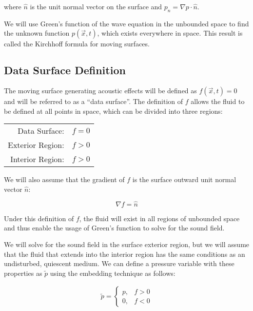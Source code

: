\documentclass[]{aiaa-tc}%
\begin{document}
\noindent where $\hat{n}$ is the unit normal vector on the surface and $p_n = \nabla p \cdot \hat{n}$.

We will use Green’s function of the wave equation in the unbounded space to find the unknown function $p(\vec{x},t)$, which exists everywhere in space. This result is called the Kirchhoff formula for moving surfaces.


\subsection{Data Surface Definition}

The moving surface generating acoustic effects will be defined as $f(\vec{x},t) = 0$ and will be referred to as a ``data surface''.  The definition of $f$ allows the fluid to be defined at all points in space, which can be divided into three regions:

\begin{center}
\begin{tabular}{| r  l |}
  \hline
  Data Surface:    & $f=0$ \\
  Exterior Region: & $f>0$ \\
  Interior Region: & $f>0$ \\
  \hline
\end{tabular}
\end{center}

\noindent We will also assume that the gradient of $f$ is the surface outward unit normal vector $\hat{n}$:

\begin{equation} \label{Gradfnormal}
\nabla f = \hat{n}
\end{equation}

Under this definition of $f$, the fluid will exist in all regions of unbounded space and thus enable the usage of Green's function to solve for the sound field.

We will solve for the sound field in the surface exterior region, but we will assume that the fluid that extends into the interior region has the same conditions as an undisturbed, quiescent medium.  We can define a pressure variable with these properties as $\widetilde{p}$ using the embedding technique as follows:

\begin{equation} \label{Ptilde}
\begin{split}
\boxed{\widetilde{p} =
    \left\{ \begin{array}{lll}
        p, & f > 0 \\
        0, & f < 0
    \end{array} \right.}
\end{split}
\end{equation}
\end{document}
